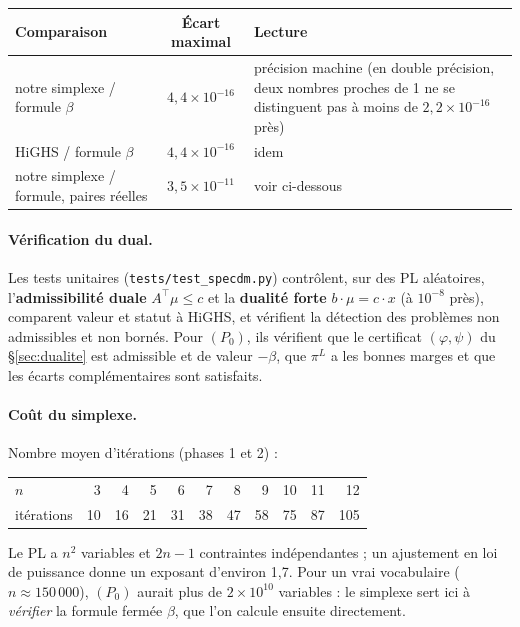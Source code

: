 \documentclass[11pt,a4paper]{article}
\theoremstyle{plain}
\theoremstyle{definition}
\begin{document}
\begin{center}
\small
\begin{tabularx}{\linewidth}{@{}lcX@{}}
\toprule
Comparaison & Écart maximal & Lecture\\\midrule
notre simplexe / formule $\beta$ & $4{,}4\times10^{-16}$ & précision machine (en double précision, deux nombres proches de 1 ne se distinguent pas à moins de $2{,}2\times10^{-16}$ près)\\
HiGHS / formule $\beta$ & $4{,}4\times10^{-16}$ & idem\\
notre simplexe / formule, paires réelles & $3{,}5\times10^{-11}$ & voir ci-dessous\\
\bottomrule
\end{tabularx}
\end{center}

\paragraph{Vérification du dual.} Les tests unitaires (\texttt{tests/test\_specdm.py}) contrôlent, sur des PL aléatoires, l'\textbf{admissibilité duale} $A^\top\mu\le c$ et la \textbf{dualité forte} $b\cdot\mu=c\cdot x$ (à $10^{-8}$ près), comparent valeur et statut à HiGHS, et vérifient la détection des problèmes non admissibles et non bornés. Pour $(P_0)$, ils vérifient que le certificat $(\varphi,\psi)$ du §\ref{sec:dualite} est admissible et de valeur $-\beta$, que $\pi^L$ a les bonnes marges et que les écarts complémentaires sont satisfaits.

\paragraph{Coût du simplexe.} Nombre moyen d'itérations (phases 1 et 2) :
\begin{center}
\small
\begin{tabular}{@{}l*{10}{r}@{}}
\toprule
$n$ & 3 & 4 & 5 & 6 & 7 & 8 & 9 & 10 & 11 & 12\\
itérations & 10 & 16 & 21 & 31 & 38 & 47 & 58 & 75 & 87 & 105\\
\bottomrule
\end{tabular}
\end{center}
Le PL a $n^2$ variables et $2n-1$ contraintes indépendantes ; un ajustement en loi de puissance donne un exposant d'environ 1,7. Pour un vrai vocabulaire ($n\approx150\,000$), $(P_0)$ aurait plus de $2\times10^{10}$ variables : le simplexe sert ici à \emph{vérifier} la formule fermée $\beta$, que l'on calcule ensuite directement.
\end{document}
